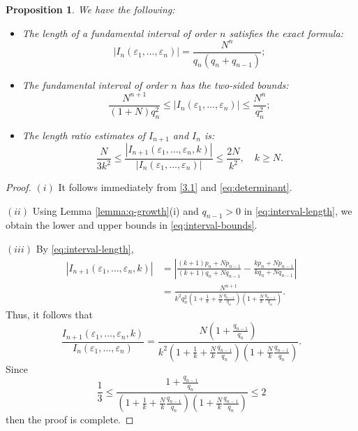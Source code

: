 \documentclass[12pt]{article}
\newtheorem{proposition}[theorem]{Proposition}
\numberwithin{equation}{section}
\begin{document}
\begin{proposition} \label{prop:interval-length}
We have the following: 
\begin{itemize}
    \item[(i)] The length of a fundamental interval of order $n$ satisfies the exact formula:
\begin{equation}
|I_n(\varepsilon_1, \ldots, \varepsilon_n)| = \frac{N^n}{q_n(q_n + q_{n-1})}; \label{eq:interval-length}
\end{equation}
%
\item[(ii)] The fundamental interval of order $n$ has the two-sided bounds:
\begin{equation}
\frac{N^{n+1}}{(1+N)q_n^2} \leq |I_n(\varepsilon_1, \ldots, \varepsilon_n)| \leq \frac{N^n}{q_n^2}; \label{eq:interval-bounds}
\end{equation}
%
\item[(iii)] The length ratio estimates of $I_{n+1}$ and $I_{n}$ is: 
\begin{equation}
\frac{N}{3k^2} \le \frac{|I_{n+1}(\varepsilon_1, \ldots, \varepsilon_n, k)|}{|I_n(\varepsilon_1, \ldots, \varepsilon_n)|} \le \frac{2N}{k^2}, \quad k \ge N. \label{3.3}
\end{equation}
\end{itemize}
\end{proposition}
%
\begin{proof}
$(i)$ It follows immediately from \eqref{3.1} and \eqref{eq:determinant}.

\noindent $(ii)$  
Using Lemma \ref{lemma:q-growth}(i) and $q_{n-1}>0$ in \eqref{eq:interval-length}, we obtain the lower and upper bounds in \eqref{eq:interval-bounds}.

\noindent $(iii)$ By {\eqref{eq:interval-length}}, 
\begin{align}
|I_{n+1}(\varepsilon_1, \ldots, \varepsilon_n, k)| &= \left| \frac{(k+1)p_n+Np_{n-1}}{(k+1)q_n+Nq_{n-1}} - \frac{kp_n+Np_{n-1}}{kq_n+Nq_{n-1}} \right| \nonumber \\
&= \frac{N^{n+1}}{k^2q^2_n(1+\frac{1}{k} +\frac{N}{k}\frac{q_{n-1}}{q_n})(1+\frac{N}{k}\frac{q_{n-1}}{q_n})}{.} 
\end{align}
%
Thus, it follows that
\begin{equation*} 
\frac{I_{n+1}(\varepsilon_1, \ldots, \varepsilon_n, k)}{I_{n}(\varepsilon_1, \ldots, \varepsilon_n)} = 
\frac{N(1+\frac{q_{n-1}}{q_n})}{k^2 (1+\frac{1}{k} +\frac{N}{k}\frac{q_{n-1}}{q_n})(1+\frac{N}{k}\frac{q_{n-1}}{q_n})}.
\end{equation*}
%
Since 
\begin{equation*}
\frac{1}{3} \le \frac{1+\frac{q_{n-1}}{q_n}}{ (1+\frac{1}{k} +\frac{N}{k}\frac{q_{n-1}}{q_n})(1+\frac{N}{k}\frac{q_{n-1}}{q_n})} \le 2
\end{equation*}
%
then the proof is complete. 
\end{proof}
\end{document}
